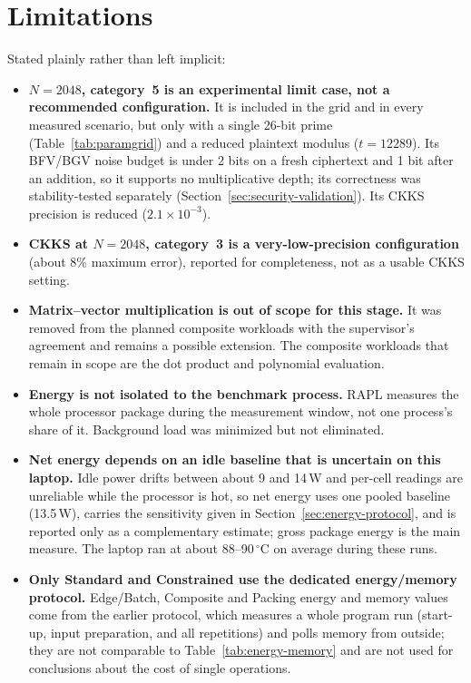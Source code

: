 \section{Limitations}
\label{sec:limitations}

Stated plainly rather than left implicit:

\begin{itemize}[leftmargin=*, itemsep=2pt]
  \item \textbf{$N{=}2048$, category~5 is an experimental limit case, not a recommended configuration.} It is included in the grid and in every measured scenario, but only with a single 26-bit prime (Table~\ref{tab:paramgrid}) and a reduced plaintext modulus ($t=12289$). Its BFV/BGV noise budget is under 2 bits on a fresh ciphertext and 1 bit after an addition, so it supports no multiplicative depth; its correctness was stability-tested separately (Section~\ref{sec:security-validation}). Its CKKS precision is reduced ($2.1{\times}10^{-3}$).
  \item \textbf{CKKS at $N{=}2048$, category~3 is a very-low-precision configuration} (about 8\% maximum error), reported for completeness, not as a usable CKKS setting.
  \item \textbf{Matrix--vector multiplication is out of scope for this stage.} It was removed from the planned composite workloads with the supervisor's agreement and remains a possible extension. The composite workloads that remain in scope are the dot product and polynomial evaluation.
  \item \textbf{Energy is not isolated to the benchmark process.} RAPL measures the whole processor package during the measurement window, not one process's share of it. Background load was minimized but not eliminated.
  \item \textbf{Net energy depends on an idle baseline that is uncertain on this laptop.} Idle power drifts between about 9 and 14\,W and per-cell readings are unreliable while the processor is hot, so net energy uses one pooled baseline (13.5\,W), carries the sensitivity given in Section~\ref{sec:energy-protocol}, and is reported only as a complementary estimate; gross package energy is the main measure. The laptop ran at about 88--90\,$^\circ$C on average during these runs.
  \item \textbf{Only Standard and Constrained use the dedicated energy/memory protocol.} Edge/Batch, Composite and Packing energy and memory values come from the earlier protocol, which measures a whole program run (start-up, input preparation, and all repetitions) and polls memory from outside; they are not comparable to Table~\ref{tab:energy-memory} and are not used for conclusions about the cost of single operations.

\end{itemize}

